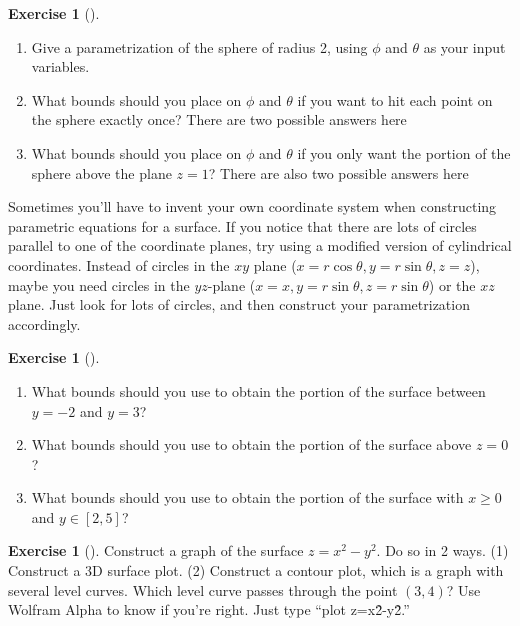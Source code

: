 \documentclass[10pt,]{book}
\theoremstyle{plain}
\theoremstyle{definition}
\theoremstyle{definition}
\theoremstyle{definition}
\theoremstyle{definition}
\newtheorem{exploration}[project]{Exercise}
\theoremstyle{definition}
\numberwithin{equation}{section}
\begin{document}
\begin{exploration}[]\label{exploration-126}
\leavevmode%
\begin{enumerate}[font=\bfseries,label=(\alph*),ref=\alph*]
\item\label{task-252} Give a parametrization of the sphere of radius 2, using \(\phi\) and \(\theta\) as your input variables.%
\item\label{task-253} What bounds should you place on \(\phi\) and \(\theta\) if you want to hit each point on the sphere exactly once? There are two possible answers here%
%
\item\label{task-254} What bounds should you place on \(\phi\) and \(\theta\) if you only want the portion of the sphere above the plane \(z=1\)? There are also two possible answers here%
%
\end{enumerate}
\end{exploration}
Sometimes you'll have to invent your own coordinate system when constructing parametric equations for a surface. If you notice that there are lots of circles parallel to one of the coordinate planes, try using a modified version of cylindrical coordinates. Instead of circles in the \(xy\) plane (\(x=r\cos\theta,y=r\sin\theta,z=z\)), maybe you need circles in the \(yz\)-plane (\(x=x,y=r\sin\theta,z=r\sin\theta\)) or the \(xz\) plane. Just look for lots of circles, and then construct your parametrization accordingly.%
\begin{exploration}[]\label{exploration-127}
\leavevmode%
\begin{enumerate}[font=\bfseries,label=(\alph*),ref=\alph*]
\item\label{task-255} What bounds should you use to obtain the portion of the surface between \(y=-2\) and \(y=3\)?%
\item\label{task-256} What bounds should you use to obtain the portion of the surface above \(z=0\)?%
\item\label{task-257} What bounds should you use to obtain the portion of the surface with \(x\geq 0\) and \(y\in[2,5]\)?%
\end{enumerate}
\end{exploration}
\begin{exploration}[]\label{exploration-128}
Construct a graph of the surface \(z = x^2-y^2\). Do so in 2 ways. (1) Construct a 3D surface plot. (2) Construct a contour plot, which is a graph with several level curves. Which level curve passes through the point \((3,4)\)? Use Wolfram Alpha to know if you're right. Just type ``plot z=x\^2-y\^2.''%
\end{exploration}
\end{document}
